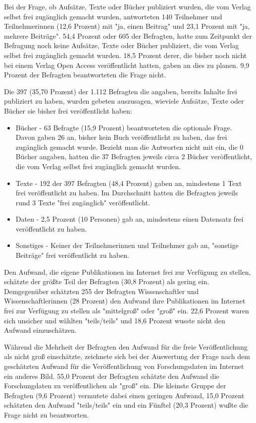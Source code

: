 Bei der Frage, ob Aufsätze, Texte oder Bücher publiziert wurden, die vom Verlag selbst frei zugänglich gemacht wurden, antworteten 140 Teilnehmer und Teilnehmerinnen (12,6 Prozent) mit "ja, einen Beitrag" und 23,1 Prozent mit "ja, mehrere Beiträge". 54,4 Prozent oder 605 der Befragten, hatte zum Zeitpunkt der Befragung noch keine Aufsätze, Texte oder Bücher publiziert, die vom Verlag selbst frei zugänglich gemacht wurden.  18,5 Prozent derer, die bisher noch nicht bei einem Verlag Open Access veröffentlicht hatten, gaben an dies zu planen. 9,9 Prozent der Befragten beantworteten die Frage nicht.

Die 397 (35,70 Prozent) der 1.112 Befragten die angaben, bereits Inhalte frei publiziert zu haben, wurden gebeten auszusagen, wieviele Aufsätze, Texte oder Bücher sie bisher frei veröffentlicht haben:
\begin{itemize}
\item Bücher - 63 Befragte (15,9 Prozent) beantworteten die optionale Frage. Davon gaben 26 an, bisher kein Buch veröffentlicht zu haben, das frei zugänglich gemacht wurde. Bezieht man die Antworten nicht mit ein, die 0 Bücher angaben, hatten die 37 Befragten jeweils circa 2 Bücher veröffentlicht, die vom Verlag selbst frei zugänglich gemacht wurden.
\item Texte - 192 der 397 Befragten (48,4 Prozent) gaben an, mindestens 1 Text frei veröffentlicht zu haben. Im Durchschnitt hatten die Befragten jeweils rund 3 Texte "frei zugänglich" veröffentlicht.
\item Daten - 2,5 Prozent (10 Personen) gab an, mindestens einen Datensatz frei veröffentlicht zu haben.
\item Sonstiges - Keiner der Teilnehmerinnen und Teilnehmer gab an, "sonstige Beiträge" frei veröffentlicht zu haben.
\end{itemize}

Den Aufwand, die eigene Publikationen im Internet frei zur Verfügung zu stellen, schätzte der größte Teil der Befragten (30,8 Prozent) als gering ein. Demgegenüber schätzten 255 der Befragten Wissenschaftler und Wissenschaftlerinnen (28 Prozent) den Aufwand ihre Publikationen im Internet frei zur Verfügung zu stellen als "mittelgroß" oder "groß" ein. 22,6 Prozent waren sich unsicher und wählten "teils/teils" und 18,6 Prozent wusste nicht den Aufwand einzuschätzen.

Während die Mehrheit der Befragten den Aufwand für die freie Veröffentlichung als nicht groß einschätzte, zeichnete sich bei der Auswertung der Frage nach dem geschätzten Aufwand für die Veröffentlichung von Forschungsdaten im Internet ein anderes Bild. 55,0 Prozent der Befragten schätzte den Aufwand die Forschungdaten zu veröffentlichen als "groß" ein. Die kleinste Gruppe der Befragten (9,6 Prozent) vermutete dabei einen geringen Aufwand, 15,0 Prozent schätzten den Aufwand "teils/teils" ein und ein Fünftel (20,3 Prozent) wußte die Frage nicht zu beantworten.

